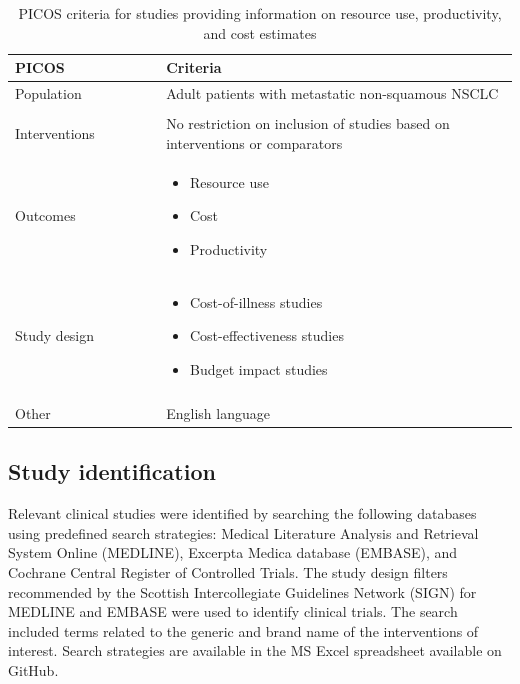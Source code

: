 \documentclass[11pt,final,fleqn]{article}\usepackage[]{graphicx}\usepackage[]{color}
\theoremstyle{plain}
\begin{document}
\begin{appendices}
\begin{table}[!ht]
\begin{center}
\begin{threeparttable}
\caption{PICOS criteria for studies providing information on resource use, productivity, and cost estimates} \label{tbl:picos-cost}
\begin{tabular}{p{0.3\linewidth}p{0.7\linewidth}}
\hline
\multicolumn{1}{l}{PICOS} &  \multicolumn{1}{l}{Criteria}\\
\hline
Population & Adult patients with metastatic non-squamous NSCLC\\
&\\
Interventions & No restriction on inclusion of studies based on interventions or comparators\\
Outcomes & 
\begin{itemize}
\item Resource use
\item Cost
\item Productivity
\end{itemize} \\
Study design &  
\begin{itemize}
\item Cost-of-illness studies
\item Cost-effectiveness studies
\item Budget impact studies
\end{itemize} \\
&\\
Other & 
English language\\
\hline
\end{tabular}
\end{threeparttable}
\end{center}
\end{table}

\subsection{Study identification}
Relevant clinical studies were identified by searching the following databases using predefined search strategies: Medical Literature Analysis and Retrieval System Online (MEDLINE), Excerpta Medica database (EMBASE), and Cochrane Central Register of Controlled Trials. The study design filters recommended by the Scottish Intercollegiate Guidelines Network (SIGN) for MEDLINE and EMBASE were used to identify clinical trials. The search included terms related to the generic and brand name of the interventions of interest. Search strategies are available in the MS Excel spreadsheet available on GitHub.


\end{appendices}
\end{document}
